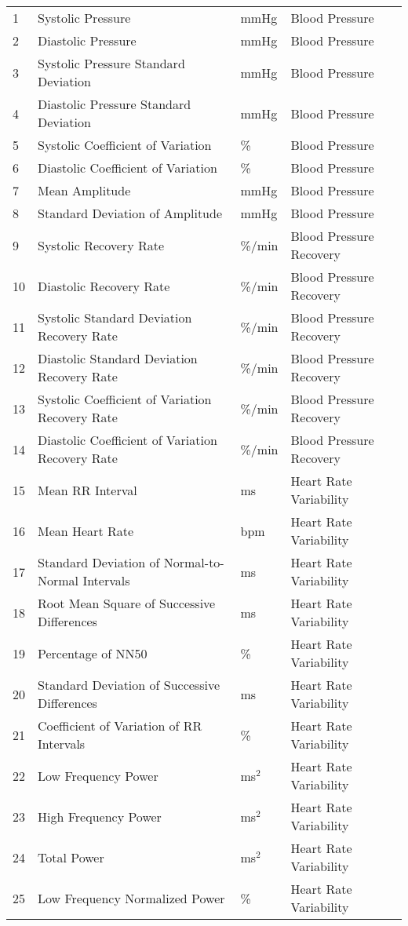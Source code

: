 \documentclass[11pt]{article}
\begin{document}
\begin{longtable}{p{1cm}p{7cm}p{3cm}p{4cm}}
1 & Systolic Pressure & mmHg & Blood Pressure \\
2 & Diastolic Pressure & mmHg & Blood Pressure \\
3 & Systolic Pressure Standard Deviation & mmHg & Blood Pressure \\
4 & Diastolic Pressure Standard Deviation & mmHg & Blood Pressure \\
5 & Systolic Coefficient of Variation & \% & Blood Pressure \\
6 & Diastolic Coefficient of Variation & \% & Blood Pressure \\
7 & Mean Amplitude & mmHg & Blood Pressure \\
8 & Standard Deviation of Amplitude & mmHg & Blood Pressure \\
9 & Systolic Recovery Rate & \%/min & Blood Pressure Recovery \\
10 & Diastolic Recovery Rate & \%/min & Blood Pressure Recovery \\
11 & Systolic Standard Deviation Recovery Rate & \%/min & Blood Pressure Recovery \\
12 & Diastolic Standard Deviation Recovery Rate & \%/min & Blood Pressure Recovery \\
13 & Systolic Coefficient of Variation Recovery Rate & \%/min & Blood Pressure Recovery \\
14 & Diastolic Coefficient of Variation Recovery Rate & \%/min & Blood Pressure Recovery \\
15 & Mean RR Interval & ms & Heart Rate Variability \\
16 & Mean Heart Rate & bpm & Heart Rate Variability \\
17 & Standard Deviation of Normal-to-Normal Intervals & ms & Heart Rate Variability \\
18 & Root Mean Square of Successive Differences & ms & Heart Rate Variability \\
19 & Percentage of NN50 & \% & Heart Rate Variability \\
20 & Standard Deviation of Successive Differences & ms & Heart Rate Variability \\
21 & Coefficient of Variation of RR Intervals & \% & Heart Rate Variability \\
22 & Low Frequency Power & ms$^2$ & Heart Rate Variability \\
23 & High Frequency Power & ms$^2$ & Heart Rate Variability \\
24 & Total Power & ms$^2$ & Heart Rate Variability \\
25 & Low Frequency Normalized Power & \% & Heart Rate Variability \\

\end{longtable}
\end{document}
